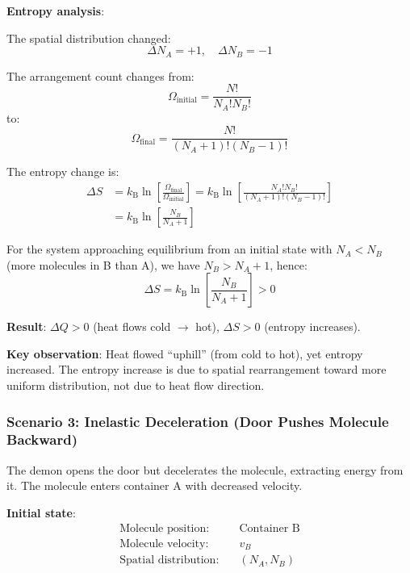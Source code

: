 \documentclass[10pt,twocolumn,letterpaper]{article}
\theoremstyle{definition}
\theoremstyle{remark}
\newcommand{\kb}{k_\text{B}}
\newcommand{\Om}{\Omega}
\begin{document}
\textbf{Entropy analysis}:

The spatial distribution changed:
\begin{equation}
\Delta N_A = +1, \quad \Delta N_B = -1
\end{equation}

The arrangement count changes from:
\begin{equation}
\Om_{\text{initial}} = \frac{N!}{N_A! N_B!}
\end{equation}
to:
\begin{equation}
\Om_{\text{final}} = \frac{N!}{(N_A+1)! (N_B-1)!}
\end{equation}

The entropy change is:
\begin{align}
\Delta S &= \kb \ln\left[\frac{\Om_{\text{final}}}{\Om_{\text{initial}}}\right] = \kb \ln\left[\frac{N_A! N_B!}{(N_A+1)! (N_B-1)!}\right] \nonumber \\
&= \kb \ln\left[\frac{N_B}{N_A+1}\right]
\label{eq:entropy_change_transfer}
\end{align}

For the system approaching equilibrium from an initial state with $N_A < N_B$ (more molecules in B than A), we have $N_B > N_A + 1$, hence:
\begin{equation}
\Delta S = \kb \ln\left[\frac{N_B}{N_A+1}\right] > 0
\end{equation}

\textbf{Result}: $\Delta Q > 0$ (heat flows cold $\to$ hot), $\Delta S > 0$ (entropy increases).

\textbf{Key observation}: Heat flowed ``uphill'' (from cold to hot), yet entropy increased. The entropy increase is due to spatial rearrangement toward more uniform distribution, not due to heat flow direction.

\subsubsection{Scenario 3: Inelastic Deceleration (Door Pushes Molecule Backward)}

The demon opens the door but decelerates the molecule, extracting energy from it. The molecule enters container A with decreased velocity.

\textbf{Initial state}:
\begin{align}
\text{Molecule position:} &\quad \text{Container B} \\
\text{Molecule velocity:} &\quad v_B \\
\text{Spatial distribution:} &\quad (N_A, N_B)
\end{align}
\end{document}
